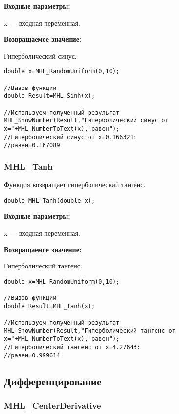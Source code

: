 \documentclass[a4paper,12pt]{article}
\begin{document}
\textbf{Входные параметры:}

 x --- входная переменная.

\textbf{Возвращаемое значение:}

Гиперболический синус.


\begin{lstlisting}[label=code_use_MHL_Sinh,caption=Пример использования]
double x=MHL_RandomUniform(0,10);

//Вызов функции
double Result=MHL_Sinh(x);

//Используем полученный результат
MHL_ShowNumber(Result,"Гиперболический синус от x="+MHL_NumberToText(x),"равен");
//Гиперболический синус от x=0.166321:
//равен=0.167089
\end{lstlisting}

\subsubsection{MHL\_Tanh}\label{MHL_Tanh}

Функция возвращает гиперболический тангенс.


\begin{lstlisting}[label=code_syntax_MHL_Tanh,caption=Синтаксис]
double MHL_Tanh(double x);
\end{lstlisting}

\textbf{Входные параметры:}

 x --- входная переменная.

\textbf{Возвращаемое значение:}

Гиперболический тангенс.


\begin{lstlisting}[label=code_use_MHL_Tanh,caption=Пример использования]
double x=MHL_RandomUniform(0,10);

//Вызов функции
double Result=MHL_Tanh(x);

//Используем полученный результат
MHL_ShowNumber(Result,"Гиперболический тангенс от x="+MHL_NumberToText(x),"равен");
//Гиперболический тангенс от x=4.27643:
//равен=0.999614
\end{lstlisting}

\subsection{Дифференцирование}

\subsubsection{MHL\_CenterDerivative}\label{MHL_CenterDerivative}
\end{document}
